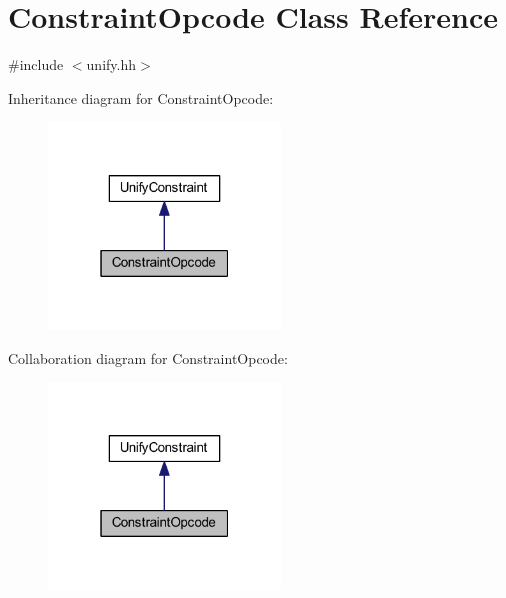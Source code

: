 \hypertarget{class_constraint_opcode}{}\section{Constraint\+Opcode Class Reference}
\label{class_constraint_opcode}


{\ttfamily \#include $<$unify.\+hh$>$}



Inheritance diagram for Constraint\+Opcode\+:
\nopagebreak
\begin{figure}[H]
\begin{center}
\leavevmode
\includegraphics[width=175pt]{class_constraint_opcode__inherit__graph}
\end{center}
\end{figure}


Collaboration diagram for Constraint\+Opcode\+:
\nopagebreak
\begin{figure}[H]
\begin{center}
\leavevmode
\includegraphics[width=175pt]{class_constraint_opcode__coll__graph}
\end{center}
\end{figure}
